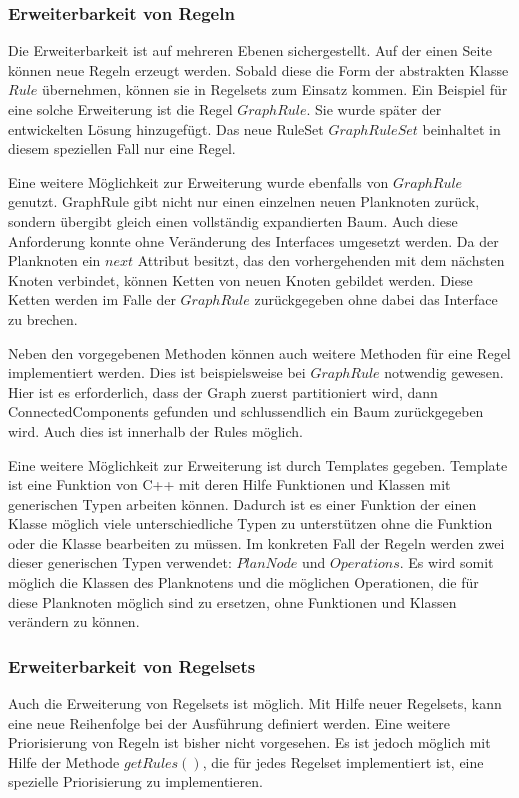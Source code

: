\subsubsection{Erweiterbarkeit von Regeln}

Die Erweiterbarkeit ist auf mehreren Ebenen sichergestellt. Auf der einen Seite können neue Regeln erzeugt werden. Sobald diese die Form der abstrakten Klasse $Rule$ übernehmen, können sie in Regelsets zum Einsatz kommen. Ein Beispiel für eine solche Erweiterung ist die Regel $GraphRule$. Sie wurde später der entwickelten Lösung hinzugefügt. Das neue RuleSet $GraphRuleSet$ beinhaltet in diesem speziellen Fall nur eine Regel.

Eine weitere Möglichkeit zur Erweiterung wurde ebenfalls von $GraphRule$ genutzt. GraphRule gibt nicht nur einen einzelnen neuen Planknoten zurück, sondern übergibt gleich einen vollständig expandierten Baum. Auch diese Anforderung konnte ohne Veränderung des Interfaces umgesetzt werden. Da der Planknoten ein $next$ Attribut besitzt, das den vorhergehenden mit dem nächsten Knoten verbindet, können Ketten von neuen Knoten gebildet werden. Diese Ketten werden im Falle der $GraphRule$ zurückgegeben ohne dabei das Interface zu brechen.

Neben den vorgegebenen  Methoden können auch weitere Methoden für eine Regel implementiert werden. Dies ist beispielsweise bei $GraphRule$ notwendig gewesen. Hier ist es erforderlich, dass der Graph zuerst partitioniert wird, dann ConnectedComponents gefunden und schlussendlich ein Baum zurückgegeben wird. Auch dies ist innerhalb der Rules möglich.

Eine weitere Möglichkeit zur Erweiterung ist durch Templates gegeben. Template ist eine Funktion von C++ mit deren Hilfe Funktionen und Klassen mit generischen Typen arbeiten können. Dadurch ist es einer Funktion der einen Klasse möglich viele unterschiedliche Typen zu unterstützen ohne die Funktion oder die Klasse bearbeiten zu müssen. Im konkreten Fall der Regeln werden zwei dieser generischen Typen verwendet: $PlanNode$ und $Operations$. Es wird somit möglich die Klassen des Planknotens und die möglichen Operationen, die für diese Planknoten möglich sind zu ersetzen, ohne Funktionen und Klassen verändern zu können.

\subsubsection{Erweiterbarkeit von Regelsets}

Auch die Erweiterung von Regelsets ist möglich. Mit Hilfe neuer Regelsets, kann eine neue Reihenfolge bei der Ausführung definiert werden. Eine weitere Priorisierung von Regeln ist bisher nicht vorgesehen. Es ist jedoch möglich mit Hilfe der Methode $getRules()$, die für jedes Regelset implementiert ist, eine spezielle Priorisierung zu implementieren. 

